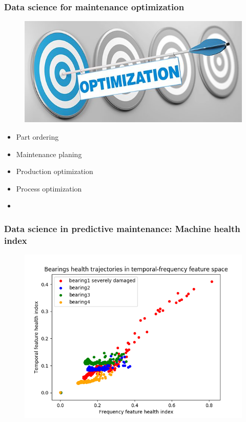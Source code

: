 \documentclass{beamer}
\begin{document}
\begin{frame}
	\frametitle{Data science for maintenance optimization}
		\begin{figure}[H]
			\centering
			\includegraphics[width=0.5\linewidth]{optimization}
		\end{figure}
	\begin{itemize}
		\item Part ordering
		\item Maintenance planing
		\item Production optimization
		\item Process optimization
		\item
	\end{itemize}
\end{frame}







\begin{frame}
	\frametitle{Data science in predictive maintenance: Machine health index}
	\begin{figure}[H]
		\centering
		\includegraphics[width=0.5\linewidth]{health_plot}
	\end{figure}
\end{frame}
\end{document}
